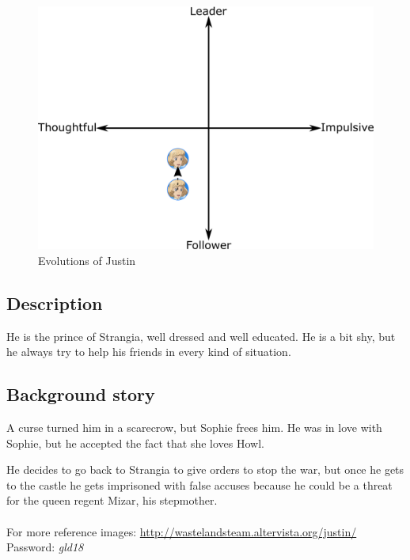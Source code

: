 \begin{figure}[H]
  \centering
   \includegraphics[width=14cm]{Images/Diagrams/Evolutions/justinEvolution}
  \caption{Evolutions of Justin}
\end{figure}

\subsection{Description}
He is the prince of Strangia, well dressed and well educated. He is a bit shy, but he always try to help his friends in every kind of situation.

\subsection{Background story}
A curse turned him in a scarecrow, but Sophie frees him. He was in love with Sophie, but he accepted the fact that she loves Howl.

He decides to go back to Strangia to give orders to stop the war, but once he gets to the castle he gets imprisoned with false accuses because he could be a threat for the queen regent Mizar, his stepmother.\\\\
For more reference images: \url{http://wastelandsteam.altervista.org/justin/}\\
Password: \textit{gld18}
